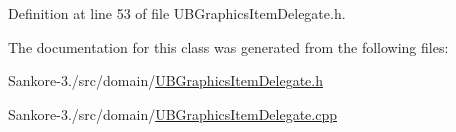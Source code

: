 Definition at line 53 of file U\-B\-Graphics\-Item\-Delegate.\-h.



The documentation for this class was generated from the following files\-:\begin{DoxyCompactItemize}
\item 
Sankore-\/3./src/domain/\hyperlink{_u_b_graphics_item_delegate_8h}{U\-B\-Graphics\-Item\-Delegate.\-h}\item 
Sankore-\/3./src/domain/\hyperlink{_u_b_graphics_item_delegate_8cpp}{U\-B\-Graphics\-Item\-Delegate.\-cpp}\end{DoxyCompactItemize}
